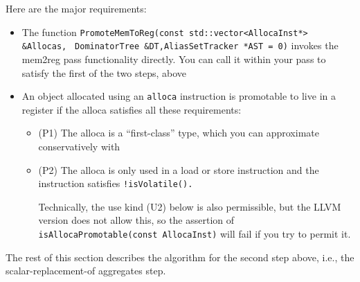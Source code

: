 Here are the major requirements:

\begin{itemize}


\item The function \lstinline|PromoteMemToReg(const std::vector<AllocaInst*> &Allocas, |
\lstinline|DominatorTree &DT,AliasSetTracker *AST = 0)| invokes the mem2reg pass functionality directly. You can call it within your
pass to satisfy the first of the two steps, above

\item An object allocated using an \lstinline|alloca| instruction is promotable to live in a register if the alloca satisfies all
these requirements:

\begin{itemize}
\item  (P1) The alloca is a “first-class” type, which you can approximate conservatively with
\item  (P2) The alloca is only used in a load or store instruction and the instruction satisfies \lstinline|!isVolatile().|

Technically, the use kind (U2) below is also permissible, but the LLVM version does not allow this, so the
assertion of \lstinline|isAllocaPromotable(const AllocaInst)| will fail if you try to permit it.


\end{itemize}    

\end{itemize}

The rest of this section describes the algorithm for the second step above, i.e., the scalar-replacement-of aggregates step.

